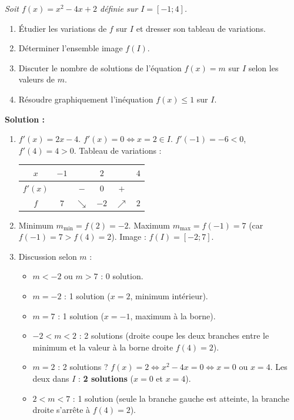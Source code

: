\documentclass[11pt]{article}
\begin{document}
\begin{exoresolu}
\emph{Soit $f(x)=x^2-4x+2$ définie sur $I=[-1;4]$.}
\begin{enumerate}
\item Étudier les variations de $f$ sur $I$ et dresser son tableau de variations.
\item Déterminer l'ensemble image $f(I)$.
\item Discuter le nombre de solutions de l'équation $f(x)=m$ sur $I$ selon les valeurs de $m$.
\item Résoudre graphiquement l'inéquation $f(x) \le 1$ sur $I$.
\end{enumerate}

\medskip
\noindent\textbf{Solution :}
\begin{enumerate}
\item $f'(x)=2x-4$. $f'(x)=0 \Leftrightarrow x=2 \in I$. $f'(-1)=-6<0$, $f'(4)=4>0$.
  Tableau de variations :
  \begin{center}
  \begin{tabular}{|c|ccccc|}\hline
  $x$ & $-1$ & & $2$ & & $4$ \\ \hline
  $f'(x)$ & & $-$ & $0$ & $+$ & \\ \hline
  $f$ & $7$ & $\searrow$ & $-2$ & $\nearrow$ & $2$ \\ \hline
  \end{tabular}
  \end{center}
\item Minimum $m_{\min}=f(2)=-2$. Maximum $m_{\max}=f(-1)=7$ (car $f(-1)=7 > f(4)=2$). Image : $f(I)=[-2;7]$.
\item Discussion selon $m$ :
  \begin{itemize}
  \item $m < -2$ ou $m > 7$ : 0 solution.
  \item $m = -2$ : 1 solution ($x=2$, minimum intérieur).
  \item $m = 7$ : 1 solution ($x=-1$, maximum à la borne).
  \item $-2 < m < 2$ : 2 solutions (droite coupe les deux branches entre le minimum et la valeur à la borne droite $f(4)=2$).
  \item $m = 2$ : 2 solutions ? $f(x)=2 \Leftrightarrow x^2-4x=0 \Leftrightarrow x=0$ ou $x=4$. Les deux dans $I$ : \textbf{2 solutions} ($x=0$ et $x=4$).
  \item $2 < m < 7$ : 1 solution (seule la branche gauche est atteinte, la branche droite s'arrête à $f(4)=2$).
  \end{itemize}

\end{enumerate}
\end{exoresolu}
\end{document}

